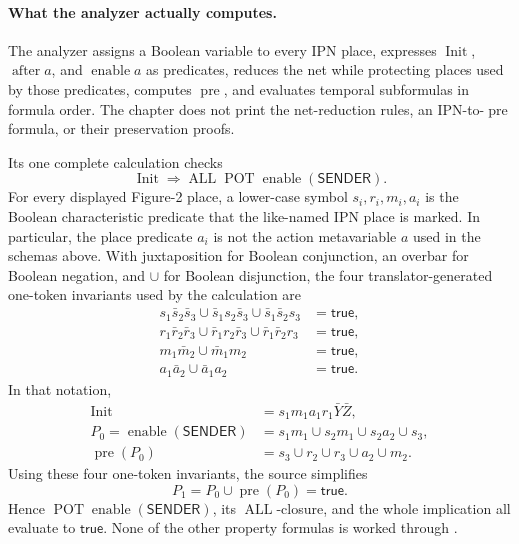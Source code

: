 \paragraph{What the analyzer actually computes.}
The analyzer assigns a Boolean variable to every IPN place, expresses
\(\operatorname{Init}\), \(\operatorname{after}a\), and
\(\operatorname{enable}a\) as predicates, reduces the net while protecting
places used by those predicates, computes \(\operatorname{pre}\), and
evaluates temporal subformulas in formula order.  The chapter does not print
the net-reduction rules, an IPN-to-\(\operatorname{pre}\) formula, or their
preservation proofs.

Its one complete calculation checks
\[
 \operatorname{Init}\Rightarrow
 \operatorname{ALL}\operatorname{POT}
 \operatorname{enable}(\mathsf{SENDER}).
\]
For every displayed Figure-2 place, a lower-case symbol
\(s_i,r_i,m_i,a_i\) is the Boolean characteristic predicate that the
like-named IPN place is marked.  In particular, the place predicate \(a_i\)
is not the action metavariable \(a\) used in the schemas above.  With
juxtaposition for Boolean conjunction, an overbar for Boolean negation, and
\(\cup\) for Boolean disjunction, the four translator-generated one-token
invariants used by the calculation are
\[
\begin{aligned}
s_1\bar s_2\bar s_3\cup\bar s_1s_2\bar s_3
 \cup\bar s_1\bar s_2s_3&=\mathsf{true},\\
r_1\bar r_2\bar r_3\cup\bar r_1r_2\bar r_3
 \cup\bar r_1\bar r_2r_3&=\mathsf{true},\\
m_1\bar m_2\cup\bar m_1m_2&=\mathsf{true},\\
a_1\bar a_2\cup\bar a_1a_2&=\mathsf{true}.
\end{aligned}
\]
In that notation,
\[
\begin{aligned}
\operatorname{Init}
 &=s_1m_1a_1r_1\bar Y\bar Z,\\
P_0=\operatorname{enable}(\mathsf{SENDER})
 &=s_1m_1\cup s_2m_1\cup s_2a_2\cup s_3,\\
\operatorname{pre}(P_0)
 &=s_3\cup r_2\cup r_3\cup a_2\cup m_2.
\end{aligned}
\]
Using these four one-token invariants, the source simplifies
\[
 P_1=P_0\cup\operatorname{pre}(P_0)=\mathsf{true}.
\]
Hence
\(\operatorname{POT}\operatorname{enable}(\mathsf{SENDER})\),
its \(\operatorname{ALL}\)-closure, and the whole implication all evaluate to
\(\mathsf{true}\).  None of the other property formulas is worked through
\cite[pp.~348--349]{QueilleSifakis1982}.

